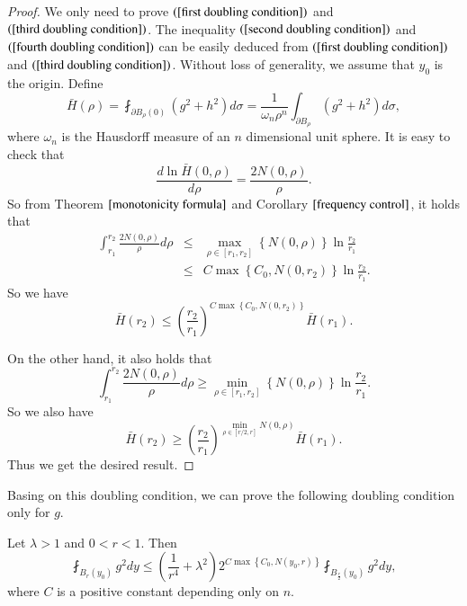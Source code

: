\documentclass[a4paper, 12pt, onecolumn]{article} \textwidth 148mm
\begin{document}
\begin{proof}
We only need to prove $(\ref{first doubling condition})$ and $(\ref{third doubling condition})$. The inequality $(\ref{second doubling condition})$ and $(\ref{fourth doubling condition})$ can be easily deduced from $(\ref{first doubling condition})$ and $(\ref{third doubling condition})$.
Without loss of generality, we assume that $y_0$ is the origin. Define
\begin{equation}\label{H(r)}
\bar{H}(\rho)=\fint_{\partial B_{\rho}(0)}(g^2+h^2)d\sigma=\frac{1}{\omega_n\rho^n}\int_{\partial B_{\rho}}(g^2+h^2)d\sigma,
\end{equation}
where $\omega_n$ is the Hausdorff measure of an $n$ dimensional unit sphere.
It is easy to check that
\begin{equation}\label{dlnH(r)/dr}
\frac{d\ln\bar{H}(0,\rho)}{d\rho}=\frac{2N(0,\rho)}{\rho}.
\end{equation}
So from Theorem $\ref{monotonicity formula}$ and Corollary $\ref{frequency control}$, it holds that
\begin{eqnarray*}
\int_{r_1}^{r_2}\frac{2N(0,\rho)}{\rho}d\rho&\leq&\max\limits_{\rho\in[r_1,r_2]}\left\{N(0,\rho)\right\}\ln\frac{r_2}{r_1}
\\&\leq&C\max\left\{C_0,N(0,r_2)\right\}\ln\frac{r_2}{r_1}.
\end{eqnarray*}
So we have
\begin{equation*}
\bar{H}(r_2)\leq\left(\frac{r_2}{r_1}\right)^{C\max\left\{C_0,N(0,r_2)\right\}}\bar{H}(r_1).
\end{equation*}


On the other hand, it also holds that
\begin{equation*}
\int_{r_1}^{r_2}\frac{2N(0,\rho)}{\rho}d\rho
\geq\min\limits_{\rho\in[r_1,r_2]}\left\{N(0,\rho)\right\}\ln\frac{r_2}{r_1}.
\end{equation*}
So we also have
\begin{equation*}
\bar{H}(r_2)\geq\left(\frac{r_2}{r_1}\right)^{\min\limits_{\rho\in[r/2,r]}N(0,\rho)}\bar{H}(r_1).
\end{equation*}
Thus we get the desired result.
\end{proof}



Basing on this doubling condition, we can prove the following doubling condition only for $g$.

\begin{lemma}\label{doubling condition only for u or v}
Let $\lambda>1$ and $0<r<1$. Then
\begin{equation}\label{doubling condition only for u}
\fint_{B_r(y_0)}g^2dy\leq\left(\frac{1}{r^4}+\lambda^2\right)
2^{C\max\left\{C_0,N(y_0,r)\right\}}\fint_{B_{\frac{r}{2}}(y_0)}g^2dy,
\end{equation}
where $C$ is a positive constant depending only on $n$.
\end{lemma}
\end{document}
